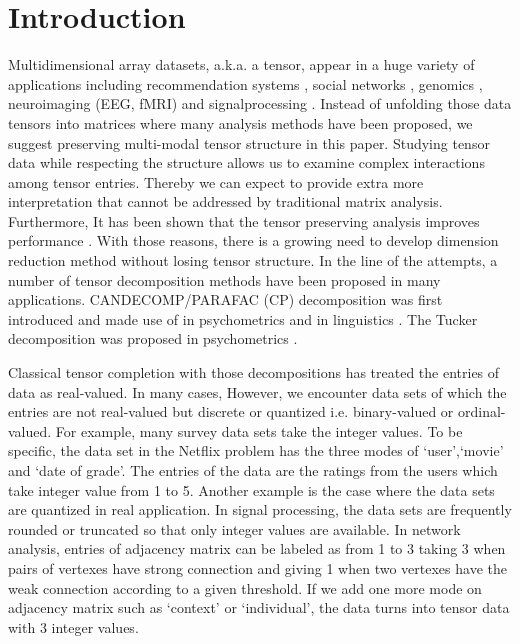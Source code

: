 \documentclass{article}
\theoremstyle{plain}
\theoremstyle{definition}
\begin{document}
\section{Introduction}
Multidimensional array datasets, a.k.a. a tensor, appear in a huge variety of applications including recommendation systems \citep{kutty2012people,adomavicius2011context,sun2017provable},
social networks \citep{sun2009multivis,nickel2011three},
genomics \citep{wang2018learning},
neuroimaging (EEG, fMRI) \citep{miwakeichi2004decomposing}
and signalprocessing \citep{sidiropoulos2000parallel,cichocki2015tensor}.
Instead of unfolding those data tensors into matrices where many analysis methods have been proposed, we suggest preserving multi-modal tensor structure in this paper. Studying tensor data while respecting the structure allows us to examine complex interactions among tensor entries. Thereby we can expect to provide extra more interpretation that cannot be addressed by traditional matrix analysis. Furthermore, It has been shown that the tensor preserving analysis improves performance \citep{zare2018extension,wang2018learning}.
With those reasons, there is a growing need to develop dimension reduction method without losing tensor structure. In the line of the attempts, a number of tensor decomposition methods have been proposed in many applications. CANDECOMP/PARAFAC (CP) decomposition was first introduced \citep{hitchcock1928multiple}
and made use of in psychometrics \citep{harshman1970foundations} and in linguistics \citep{smilde2005multi}. The Tucker decomposition was proposed in psychometrics \citep{tucker1964extension,tucker1966some}.

Classical tensor completion with those decompositions has treated the entries of data as real-valued.
In many cases, However, we encounter data sets of which the entries are not real-valued but discrete or quantized i.e. binary-valued or ordinal-valued. For example, many survey data sets take the integer values. To be specific, the data set in the Netflix problem has the three modes of `user',`movie' and `date of grade'. The entries of the data are the ratings from the users which take integer value from 1 to 5. Another example is the case where the data sets are quantized in real application. In signal processing, the data sets are frequently rounded or truncated so that only integer values are available. In network analysis, entries of adjacency matrix can be labeled as from 1 to 3 taking 3 when pairs of vertexes have strong connection and giving 1 when two vertexes have the weak connection according to a given threshold. If we add one more mode on adjacency matrix such as `context' or `individual', the data turns into tensor data with 3 integer values.
\end{document}
